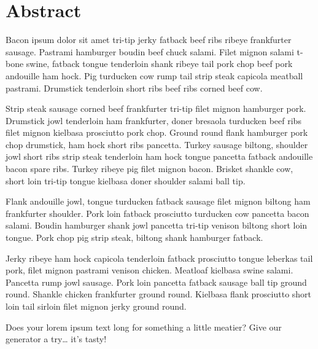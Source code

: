 \chapter*{Abstract}

\thispagestyle{empty}

Bacon ipsum dolor sit amet tri-tip jerky fatback beef ribs ribeye frankfurter sausage. Pastrami hamburger boudin beef chuck salami. Filet mignon salami t-bone swine, fatback tongue tenderloin shank ribeye tail pork chop beef pork andouille ham hock. Pig turducken cow rump tail strip steak capicola meatball pastrami. Drumstick tenderloin short ribs beef ribs corned beef cow.

Strip steak sausage corned beef frankfurter tri-tip filet mignon hamburger pork. Drumstick jowl tenderloin ham frankfurter, doner bresaola turducken beef ribs filet mignon kielbasa prosciutto pork chop. Ground round flank hamburger pork chop drumstick, ham hock short ribs pancetta. Turkey sausage biltong, shoulder jowl short ribs strip steak tenderloin ham hock tongue pancetta fatback andouille bacon spare ribs. Turkey ribeye pig filet mignon bacon. Brisket shankle cow, short loin tri-tip tongue kielbasa doner shoulder salami ball tip.

Flank andouille jowl, tongue turducken fatback sausage filet mignon biltong ham frankfurter shoulder. Pork loin fatback prosciutto turducken cow pancetta bacon salami. Boudin hamburger shank jowl pancetta tri-tip venison biltong short loin tongue. Pork chop pig strip steak, biltong shank hamburger fatback.

Jerky ribeye ham hock capicola tenderloin fatback prosciutto tongue leberkas tail pork, filet mignon pastrami venison chicken. Meatloaf kielbasa swine salami. Pancetta rump jowl sausage. Pork loin pancetta fatback sausage ball tip ground round. Shankle chicken frankfurter ground round. Kielbasa flank prosciutto short loin tail sirloin filet mignon jerky ground round.

Does your lorem ipsum text long for something a little meatier? Give our generator a try… it’s tasty!
